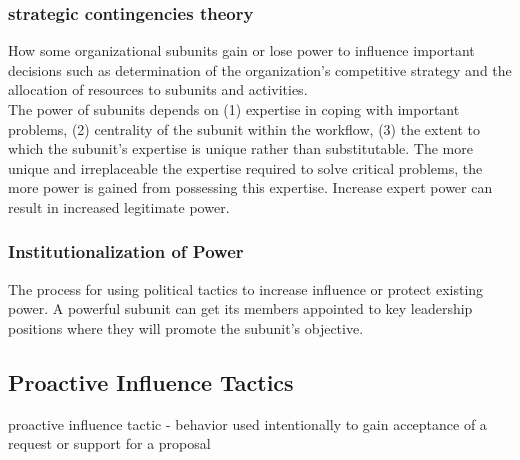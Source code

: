 \subsubsection{strategic contingencies theory} %
\label{ssub:strategic_contingencies_theory}
	How some organizational subunits gain or lose power to influence important decisions such as determination of the organization’s competitive strategy and the allocation of resources to subunits and activities.
	\\The power of subunits depends on (1) expertise in coping with important problems, (2) centrality of the subunit within the workflow, (3) the extent to which the subunit’s expertise is unique rather than substitutable. The more unique and irreplaceable the expertise required to solve critical problems, the more power is gained from possessing this expertise. Increase expert power can result in increased legitimate power.


\subsubsection{Institutionalization of Power} %
\label{ssub:institutionalization_of_power}
	The process for using political tactics to increase influence or protect existing power. A powerful subunit can get its members appointed to key leadership positions where they will promote the subunit’s objective.



\subsection{Proactive Influence Tactics} %
\label{sub:proactive_influence_tactics}
	proactive influence tactic - behavior used intentionally to gain acceptance of a request or support for a proposal

